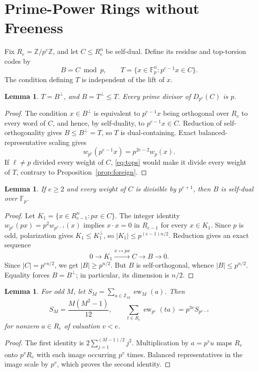 \documentclass[12pt,letterpaper,onecolumn]{article}
\newtheorem{lemma}[theorem]{Lemma}
\newcommand{\Z}{\mathbb{Z}}
\newcommand{\F}{\mathbb{F}}
\newcommand{\ew}{\operatorname{ew}}
\begin{document}
\section{Prime-Power Rings without Freeness}
Fix $R_e=\Z/p^e\Z$, and let $C\le R_e^n$ be self-dual. Define its residue and top-torsion codes by
\begin{equation}
 B=C\bmod p,\qquad T=\{x\in\F_p^n:p^{e-1}x\in C\}.
 \label{eq:layers}
\end{equation}
The condition defining $T$ is independent of the lift of $x$.

\begin{lemma}\label{lem:duality}
$T=B^\perp$, and $B=T^\perp\le T$. Every prime divisor of $D_{p^e}(C)$ is $p$.
\end{lemma}
\begin{proof}
The condition $x\in B^\perp$ is equivalent to $p^{e-1}x$ being orthogonal over $R_e$ to every word of $C$, and hence, by self-duality, to $p^{e-1}x\in C$. Reduction of self-orthogonality gives $B\le B^\perp=T$, so $T$ is dual-containing. Exact balanced-representative scaling gives
\begin{equation}
 w_{p^e}(p^{e-1}x)=p^{2e-2}w_p(x).
 \label{eq:tops}
\end{equation}
If $\ell\ne p$ divided every weight of $C$, \eqref{eq:tops} would make it divide every weight of $T$, contrary to Proposition~\ref{prop:foreign}.
\end{proof}

\begin{lemma}\label{lem:saturation}
If $e\ge2$ and every weight of $C$ is divisible by $p^{e+1}$, then $B$ is self-dual over $\F_p$.
\end{lemma}
\begin{proof}
Let $K_1=\{x\in R_{e-1}^n:px\in C\}$. The integer identity $w_{p^e}(px)=p^2w_{p^{e-1}}(x)$ implies $x\cdot x=0$ in $R_{e-1}$ for every $x\in K_1$. Since $p$ is odd, polarization gives $K_1\le K_1^\perp$, so $|K_1|\le p^{(e-1)n/2}$. Reduction gives an exact sequence
\[
 0\longrightarrow K_1\xrightarrow{x\mapsto px}C\longrightarrow B\longrightarrow0.
\]
Since $|C|=p^{en/2}$, we get $|B|\ge p^{n/2}$. But $B$ is self-orthogonal, whence $|B|\le p^{n/2}$. Equality forces $B=B^\perp$; in particular, its dimension is $n/2$.
\end{proof}

\begin{lemma}\label{lem:orbit}
For odd $M$, let $S_M=\sum_{a\in\Z_M}\ew_M(a)$. Then
\begin{equation}
 S_M=\frac{M(M^2-1)}{12},\qquad
 \sum_{t\in R_e}\ew_{p^e}(ta)=p^{3v}S_{p^{e-v}}
 \label{eq:orbit}
\end{equation}
for nonzero $a\in R_e$ of valuation $v<e$.
\end{lemma}
\begin{proof}
The first identity is $2\sum_{j=1}^{(M-1)/2}j^2$. Multiplication by $a=p^vu$ maps $R_e$ onto $p^vR_e$ with each image occurring $p^v$ times. Balanced representatives in the image scale by $p^v$, which proves the second identity.
\end{proof}
\end{document}
